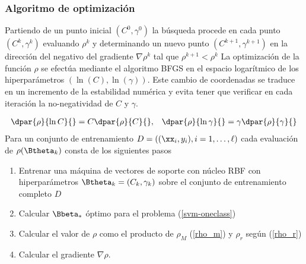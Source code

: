 \subsubsection{Algoritmo de optimización}
Partiendo de un punto inicial $(C^0,\gamma^0)$ la búsqueda procede
en cada punto $(C^k,\gamma^k)$ evaluando $\rho^k$ y determinando
un nuevo punto $(C^{k+1},\gamma^{k+1})$ en la dirección del
negativo del gradiente $\nabla\rho^k$ tal que $\rho^{k+1}<\rho^k$
La optimización de la función $\rho$ se efectúa mediante el algoritmo
BFGS \cite{bfgs} en el espacio logarítmico de los hiperparámetros
$(\ln(C),\ln(\gamma))$. Este cambio de coordenadas se traduce en un
incremento de la estabilidad numérica y evita tener que verificar en
cada iteración la no-negatividad de $C$ y $\gamma$.

\begin{align}
  \dpar{\rho}{\ln C}{}= C \dpar{\rho}{C}{}, &&
  \dpar{\rho}{\ln \gamma}{}= \gamma \dpar{\rho}{\gamma}{}
\end{align}
Para un conjunto de entrenamiento $D=((\xx_i,y_i),i=1,\ldots,\ell)$
cada evaluación de $\rho(\Btheta_k)$ consta de los siguientes pasos

\begin{enumerate}
\item Entrenar una máquina de vectores de soporte con núcleo RBF
  con hiperparámetros $\Btheta_k=(C_k,\gamma_k)$ sobre el conjunto
  de entrenamiento completo $D$
\item Calcular $\Bbeta_*$ óptimo para el problema (\ref{svm-oneclass})
\item Calcular el valor de $\rho$ como el producto de
  $\rho_M$ (\ref{rho_m}) y $\rho_r$ según (\ref{rho_r})
\item Calcular el gradiente $\nabla\rho$.
\end{enumerate}